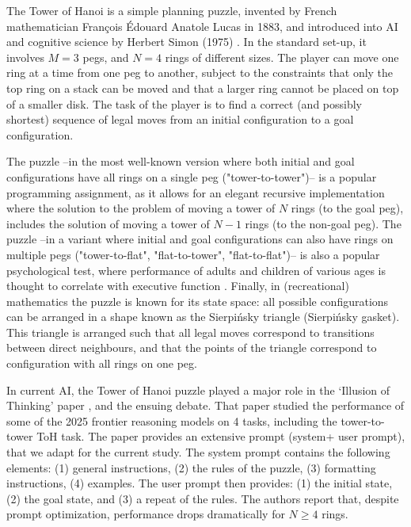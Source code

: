 \documentclass{article} %
\begin{document}
The Tower of Hanoi is a simple planning puzzle, invented by French mathematician François Édouard Anatole Lucas in 1883, and introduced into AI and cognitive science by Herbert Simon (1975) \nocite{simon_functional_1975}. In the standard set-up, it involves $M=3$ pegs, and $N=4$ rings of different sizes. 
The player can move one ring at a time from one peg to another, subject to the constraints that only the top ring on a stack can be moved and that a larger ring cannot be placed on top of a smaller disk. 
The task of the player is to find a correct (and possibly shortest) sequence of legal moves from an initial configuration to a goal configuration.

The puzzle --in the most well-known version where both initial and goal configurations have all rings on a single peg ("tower-to-tower")-- is a popular programming assignment, as it allows for an elegant recursive implementation where the solution to the problem of moving a tower of $N$ rings (to the goal peg), includes the solution of moving a tower of $N-1$ rings (to the non-goal peg). 
The puzzle --in a variant where initial and goal configurations can also have rings on multiple pegs ("tower-to-flat", "flat-to-tower", "flat-to-flat")-- is also a popular psychological test, where performance of adults and children of various ages is thought to correlate with executive function \citep{welsh_development_2001}.
Finally, in (recreational) mathematics the puzzle is known for its state space: all possible configurations can be arranged in a shape known as the Sierpi\'nsky triangle (Sierpi\'nsky gasket). This triangle is arranged such that all legal moves correspond to transitions between direct neighbours, and that the points of the triangle correspond to configuration with all rings on one peg. 

In current AI, the Tower of Hanoi puzzle played a major role in the `Illusion of Thinking' paper \citep{shojaee2025illusion}, and the ensuing debate. That paper studied the performance of some of the 2025 frontier reasoning models on 4 tasks, including the tower-to-tower ToH task. The paper provides an extensive prompt (system+ user prompt), that we adapt for the current study. The system prompt contains the following elements: (1) general instructions, (2) the rules of the puzzle, (3) formatting instructions, (4) examples. The user prompt then provides: (1) the initial state, (2) the goal state, and (3) a repeat of the rules. The authors report that, despite prompt optimization, performance drops dramatically for $N\geq4$ rings. 
\end{document}

